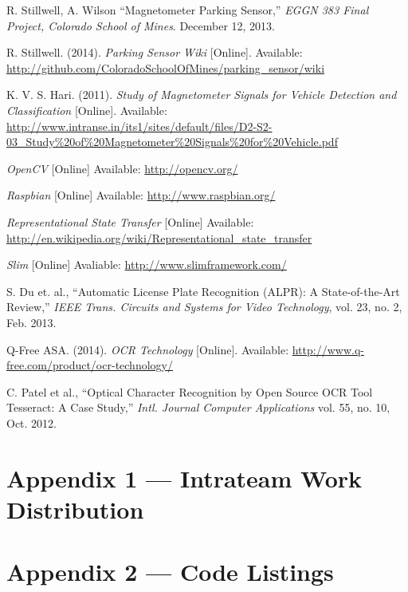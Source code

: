 \documentclass[11pt, oneside, fullpage, doublespace]{article}
\begin{document}
\begin{thebibliography}{99}
 R. Stillwell, A. Wilson ``Magnetometer Parking Sensor,'' \emph{EGGN 383 Final Project, Colorado School of Mines}. December 12, 2013.

 R. Stillwell. (2014). \emph{Parking Sensor Wiki} [Online]. Available: \url{http://github.com/ColoradoSchoolOfMines/parking_sensor/wiki}

 K. V. S. Hari. (2011). \emph{Study of Magnetometer Signals for Vehicle Detection and Classification} [Online]. Available: \url{http://www.intranse.in/its1/sites/default/files/D2-S2-03_Study\%20of\%20Magnetometer\%20Signals\%20for\%20Vehicle.pdf}

 \emph{OpenCV} [Online] Available: \url{http://opencv.org/}

 \emph{Raspbian} [Online] Available: \url{http://www.raspbian.org/}

 \emph{Representational State Transfer} [Online] Available: \url{http://en.wikipedia.org/wiki/Representational_state_transfer}

 \emph{Slim} [Online] Avaliable: \url{http://www.slimframework.com/}

 S. Du et. al., ``Automatic License Plate Recognition (ALPR): A State-of-the-Art Review,'' \emph{IEEE Trans. Circuits and Systems for Video Technology}, vol. 23, no. 2, Feb. 2013.

 Q-Free ASA. (2014). \emph{OCR Technology} [Online]. Available: \url{http://www.q-free.com/product/ocr-technology/}

 C. Patel et al., ``Optical Character Recognition by Open Source OCR Tool Tesseract: A Case Study,'' \emph{Intl. Journal Computer Applications} vol. 55, no. 10, Oct. 2012.

\end{thebibliography}


\section*{Appendix 1 --- Intrateam Work Distribution}


\section*{Appendix 2 --- Code Listings}
\end{document}
